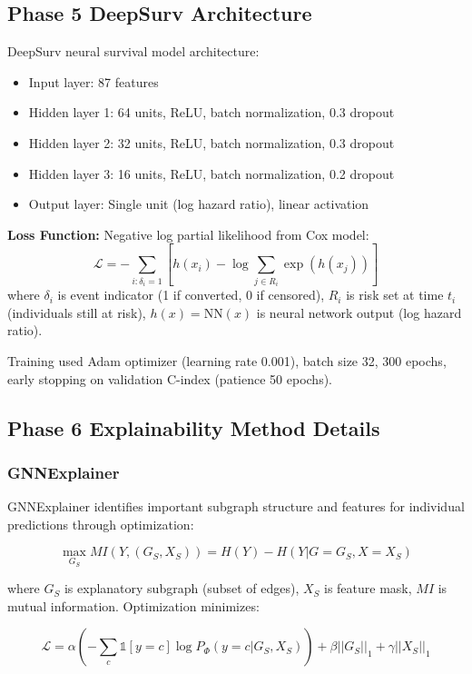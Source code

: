 \documentclass[11pt]{article}
\begin{document}
\subsection{Phase 5 DeepSurv Architecture}

DeepSurv neural survival model architecture:
\begin{itemize}
    \item Input layer: 87 features
    \item Hidden layer 1: 64 units, ReLU, batch normalization, 0.3 dropout
    \item Hidden layer 2: 32 units, ReLU, batch normalization, 0.3 dropout
    \item Hidden layer 3: 16 units, ReLU, batch normalization, 0.2 dropout
    \item Output layer: Single unit (log hazard ratio), linear activation
\end{itemize}

\textbf{Loss Function:} Negative log partial likelihood from Cox model:
$$\mathcal{L} = -\sum_{i: \delta_i = 1} \left[ h(x_i) - \log \sum_{j \in R_i} \exp(h(x_j)) \right]$$
where $\delta_i$ is event indicator (1 if converted, 0 if censored), $R_i$ is risk set at time $t_i$ (individuals still at risk), $h(x) = \text{NN}(x)$ is neural network output (log hazard ratio).

Training used Adam optimizer (learning rate 0.001), batch size 32, 300 epochs, early stopping on validation C-index (patience 50 epochs).

\subsection{Phase 6 Explainability Method Details}

\subsubsection{GNNExplainer}
GNNExplainer identifies important subgraph structure and features for individual predictions through optimization:

$$\max_{G_S} MI(Y, (G_S, X_S)) = H(Y) - H(Y | G = G_S, X = X_S)$$

where $G_S$ is explanatory subgraph (subset of edges), $X_S$ is feature mask, $MI$ is mutual information. Optimization minimizes:

$$\mathcal{L} = \alpha \left( -\sum_c \mathbb{1}[y=c] \log P_{\Phi}(y=c | G_S, X_S) \right) + \beta ||G_S||_1 + \gamma ||X_S||_1$$
\end{document}
